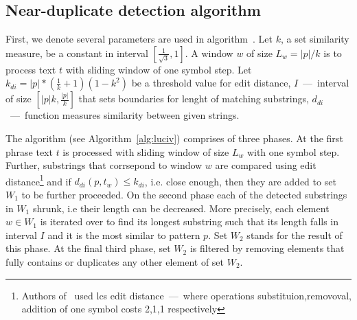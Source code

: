 
\subsection{Near-duplicate detection algorithm}
First, we denote several parameters are used in algorithm~\cite{.}.
Let $k$, a set similarity measure, be a constant in interval $[\frac{1}{\sqrt{3}},1]$.
A window $w$ of size $L_{w} = |p|/k$ is to process text $t$ with sliding window of one symbol step.
Let $k_{di} = |p|*(\frac{1}{k}+1)(1-k^2)$ be a threshold value for edit distance,
$I$~---~interval of size $[|p|k,\frac{|p|}{k}]$ that sets boundaries for lenght of matching substrings,
$d_{di}$~---~function measures similarity between given strings.

The algorithm (see Algorithm~\ref{alg:luciv}) comprises of three phases.
At the first phrase text $t$ is processed with sliding window of size $L_{w}$ with one symbol step.
Further, substrings that corrsepond to window $w$ are compared using edit distance\footnote{
  Authors of~\cite{.} used lcs edit distance~---~where  operations substituion,removoval, addition of one symbol costs 2,1,1 respectively}
and if $d_{di}(p,t_{w}) \leq k_{di}$, i.e. close enough, then they are added to set $W_{1}$ to be further proceeded. 
On the second phase each of the detected substrings in $W_{1}$ shrunk, i.e their length can be decreased.
More precisely, each element $w \in W_{1}$ is iterated over to find its longest substring such that its length falls in interval $I$ and it is the most similar to pattern $p$.
Set $W_2$ stands for the result of this phase.
At the final third phase, set $W_{2}$ is filtered by removing elements that fully contains or duplicates any other element of set $W_{2}$.

